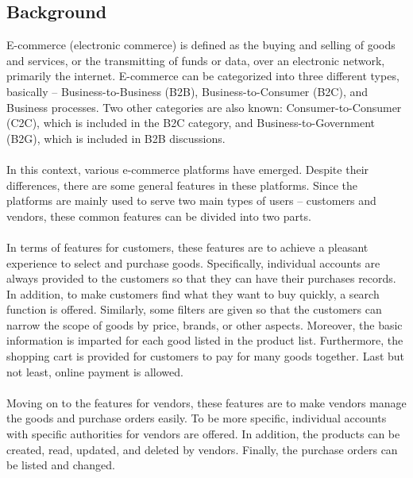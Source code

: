 \documentclass{article}
\begin{document}
\subsection{Background}
E-commerce (electronic commerce) is defined as the buying and selling of goods and services, or the transmitting of funds or data, over an electronic network, primarily the internet. E-commerce can be categorized into three different types, basically – Business-to-Business (B2B), Business-to-Consumer (B2C), and Business processes. Two other categories are also known: Consumer-to-Consumer (C2C), which is included in the B2C category, and Business-to-Government (B2G), which is included in B2B discussions. \cite{2.1}
\\\\
In this context, various e-commerce platforms have emerged. Despite their differences, there are some general features in these platforms. Since the platforms are mainly used to serve two main types of users – customers and vendors, these common features can be divided into two parts.
\\\\
In terms of features for customers, these features are to achieve a pleasant experience to select and purchase goods. Specifically, individual accounts are always provided to the customers so that they can have their purchases records. In addition, to make customers find what they want to buy quickly, a search function is offered. Similarly, some filters are given so that the customers can narrow the scope of goods by price, brands, or other aspects. Moreover, the basic information is imparted for each good listed in the product list. Furthermore, the shopping cart is provided for customers to pay for many goods together. Last but not least, online payment is allowed.
\\\\
Moving on to the features for vendors, these features are to make vendors manage the goods and purchase orders easily. To be more specific, individual accounts with specific authorities for vendors are offered. In addition, the products can be created, read, updated, and deleted by vendors. Finally, the purchase orders can be listed and changed.
\end{document}
